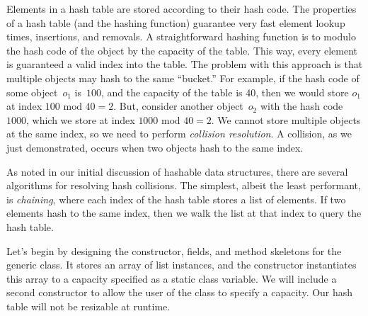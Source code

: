 Elements in a hash table are stored according to their hash code. 
The properties of a hash table (and the hashing function) guarantee very fast element lookup times, insertions, and removals. 
A straightforward hashing function is to modulo the hash code of the object by the capacity of the table. 
This way, every element is guaranteed a valid index into the table. 
The problem with this approach is that multiple objects may hash to the same ``bucket.'' 
For example, if the hash code of some object~$o_1$ is~$100$, and the capacity of the table is $40$, then we would store $o_1$ at index $100 \text{ mod } 40 = 2$. 
But, consider another object~$o_2$ with the hash code~$1000$, which we store at index $1000 \text{ mod } 40 = 2$. 
We cannot store multiple objects at the same index, so we need to perform \emph{collision resolution}. 
A collision, as we just demonstrated, occurs when two objects hash to the same index. 

As noted in our initial discussion of hashable data structures, there are several algorithms for resolving hash collisions. The simplest, albeit the least performant, is \emph{chaining}, where each index of the hash table stores a list of elements. If two elements hash to the same index, then we walk the list at that index to query the hash table. 

Let's begin by designing the constructor, fields, and method skeletons for the generic  class. It stores an array of list instances, and the constructor instantiates this array to a capacity specified as a static class variable. We will include a second constructor to allow the user of the class to specify a capacity. Our hash table will not be resizable at runtime.

